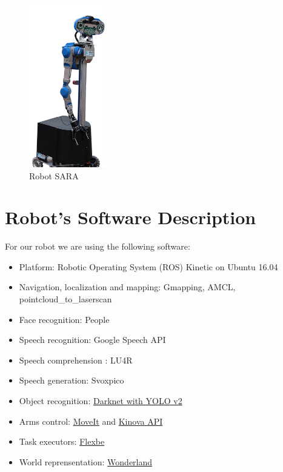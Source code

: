 \begin{figure}
	\centering
	\includegraphics[width=0.30\textwidth]{images/sara.png}
	\caption{Robot SARA}
\end{figure}
\section*{Robot's Software Description}

For our robot we are using the following software:

\begin{itemize}
	\item Platform: Robotic Operating System (ROS) Kinetic on Ubuntu 16.04
	\item Navigation, localization and mapping: Gmapping, AMCL, pointcloud\_to\_laserscan
	\item Face recognition: People
	\item Speech recognition: Google Speech API
	\item Speech comprehension : LU4R
	\item Speech generation: Svoxpico
	\item Object recognition: \href{https://github.com/WalkingMachine/wm_darknet}{Darknet with YOLO v2 }
	\item Arms control: \href{http://wiki.ros.org/moveit}{MoveIt} and \href{https://github.com/Kinovarobotics/kinova-ros}{Kinova API}
	\item Task executors: \href{http://wiki.ros.org/flexbe}{Flexbe} 
	\item World reprensentation: \href{http://github.com/walkingmachine/wonderland}{Wonderland}
\end{itemize}